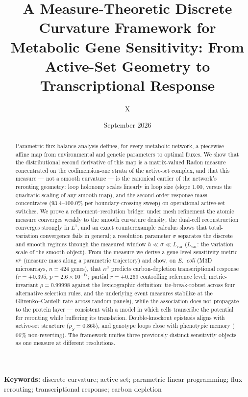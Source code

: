 \documentclass[11pt,a4paper]{article}
\title{A Measure-Theoretic Discrete Curvature Framework for Metabolic
       Gene Sensitivity: From Active-Set Geometry to Transcriptional
       Response}
\author{X}
\date{September 2026}
\theoremstyle{plain}
\theoremstyle{definition}
\theoremstyle{remark}
\newcommand{\kmu}{\kappa^{\mu}}
\begin{document}
\maketitle

\begin{abstract}
\noindent
Parametric flux balance analysis defines, for every metabolic network, a
piecewise-affine map from environmental and genetic parameters to optimal
fluxes. We show that the distributional second derivative of this map is a
matrix-valued Radon measure concentrated on the codimension-one strata of the
active-set complex, and that this measure --- not a smooth curvature ---
is the canonical carrier of the network's rerouting geometry: loop holonomy
scales linearly in loop size (slope $1.00$, versus the quadratic scaling of
any smooth map), and the second-order response mass concentrates
($93.4$--$100.0\%$ per boundary-crossing sweep) on operational active-set
switches. We prove a refinement--resolution bridge: under mesh refinement the
atomic measure converges weakly to the smooth curvature density, the dual-cell reconstruction converges strongly in $L^1$, and an exact counterexample calculus shows that total-variation convergence fails in general; a resolution parameter $\sigma$ separates the discrete and smooth
regimes through the measured window $h \ll \sigma \ll L_{\mathrm{var}}$
($L_{\mathrm{var}}$: the variation scale of the smooth object).
From the measure we derive a gene-level sensitivity metric $\kmu$ (measure
mass along a parametric trajectory) and show, on
\emph{E.~coli} (M3D microarrays, $n=424$ genes), that $\kmu$ predicts
carbon-depletion transcriptional response ($r = +0.395$,
$p = 2.6 \times 10^{-17}$; partial $r = +0.269$ controlling reference
level; metric-invariant $\rho = 0.99998$ against the lexicographic
definition; tie-break-robust across four alternative selection rules, and the underlying event measures stabilize at the Glivenko--Cantelli rate across random panels), while the
association does not propagate to the protein layer
--- consistent with a model in which cells transcribe the potential for
rerouting while buffering its translation. Double-knockout epistasis aligns
with active-set structure ($\rho_S = 0.865$), and genotype loops close with
phenotypic memory ($66\%$ non-reverting). The framework unifies three
previously distinct sensitivity objects as one measure at different
resolutions.
\end{abstract}

\medskip
\noindent\textbf{Keywords:} discrete curvature; active set; parametric
linear programming; flux rerouting; transcriptional response;
carbon depletion
\end{document}
